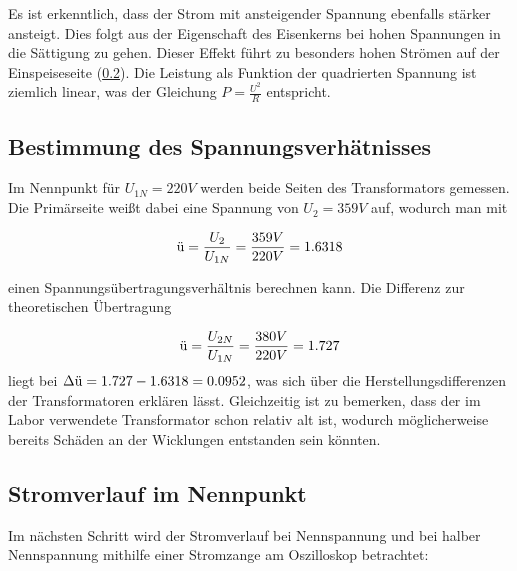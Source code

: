 \documentclass{article}
\begin{document}
Es ist erkenntlich, dass der Strom mit ansteigender Spannung ebenfalls stärker ansteigt. Dies folgt aus der Eigenschaft des Eisenkerns bei hohen Spannungen in die Sättigung zu gehen. Dieser Effekt führt zu besonders hohen Strömen auf der Einspeiseseite (\ref{sec:stromv-im-nennp}). Die Leistung als Funktion der quadrierten Spannung ist ziemlich linear, was der Gleichung $P = \frac{U^{2}}{R}$ entspricht.

\subsection{Bestimmung des Spannungsverhätnisses}
\label{sec:best-des-spann}

Im Nennpunkt für $U_{1N} = 220V$ werden beide Seiten des Transformators gemessen. Die Primärseite weißt dabei eine Spannung von $U_{2} = 359V$ auf, wodurch man mit

\begin{equation*}
  \textnormal{ü} = \frac{U_{2}}{U_{1N}} = \frac{359V}{220V} = 1.6318
\end{equation*}

einen Spannungsübertragungsverhältnis berechnen kann. Die Differenz zur theoretischen Übertragung

\begin{equation*}
  \label{eq:3}
  \textnormal{ü} = \frac{U_{2N}}{U_{1N}} = \frac{380V}{220V} = 1.727
\end{equation*}
liegt bei $\Delta \textnormal{ü} = 1.727 - 1.6318 = 0.0952 $, was sich über die Herstellungsdifferenzen der Transformatoren erklären lässt. Gleichzeitig ist zu bemerken, dass der im Labor verwendete Transformator schon relativ alt ist, wodurch möglicherweise bereits Schäden an der Wicklungen entstanden sein könnten.

\newpage
\subsection{Stromverlauf im Nennpunkt}
\label{sec:stromv-im-nennp}

Im nächsten Schritt wird der Stromverlauf bei Nennspannung und bei halber Nennspannung mithilfe einer Stromzange am Oszilloskop betrachtet:
\end{document}
